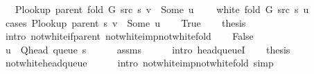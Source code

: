 \begin{isabellebody}
\ \ \ {\isachardoublequoteopen}P{\isacharunderscore}{\kern0pt}lookup\ {\isacharparenleft}{\kern0pt}parent\ {\isacharparenleft}{\kern0pt}fold\ G\ src\ s{\isacharparenright}{\kern0pt}{\isacharparenright}{\kern0pt}\ v\ {\isacharequal}{\kern0pt}\ Some\ u{\isachardoublequoteclose}\isanewline
\ \ \ {\isachardoublequoteopen}{\isasymnot}\ white\ {\isacharparenleft}{\kern0pt}fold\ G\ src\ s{\isacharparenright}{\kern0pt}\ u{\isachardoublequoteclose}\isanewline
%
\isadelimproof
%
\endisadelimproof
%
\isatagproof
{}\isamarkupfalse%
\ {\isacharparenleft}{\kern0pt}cases\ {\isachardoublequoteopen}P{\isacharunderscore}{\kern0pt}lookup\ {\isacharparenleft}{\kern0pt}parent\ s{\isacharparenright}{\kern0pt}\ v\ {\isacharequal}{\kern0pt}\ Some\ u{\isachardoublequoteclose}{\isacharparenright}{\kern0pt}\isanewline
\ \ \isamarkupfalse%
\ True\isanewline
\ \ \isamarkupfalse%
\ {\isacharquery}{\kern0pt}thesis\isanewline
\ \ \ \ \isamarkupfalse%
\ {\isacharparenleft}{\kern0pt}intro\ not{\isacharunderscore}{\kern0pt}white{\isacharunderscore}{\kern0pt}if{\isacharunderscore}{\kern0pt}parent\ not{\isacharunderscore}{\kern0pt}white{\isacharunderscore}{\kern0pt}imp{\isacharunderscore}{\kern0pt}not{\isacharunderscore}{\kern0pt}white{\isacharunderscore}{\kern0pt}fold{\isacharparenright}{\kern0pt}\isanewline
{}\isamarkupfalse%
\isanewline
\ \ \isamarkupfalse%
\ False\isanewline
\ \ \isamarkupfalse%
\ {\isachardoublequoteopen}u\ {\isacharequal}{\kern0pt}\ Q{\isacharunderscore}{\kern0pt}head\ {\isacharparenleft}{\kern0pt}queue\ s{\isacharparenright}{\kern0pt}{\isachardoublequoteclose}\isanewline
\ \ \ \ \isamarkupfalse%
\ assms\isanewline
\ \ \ \ \isamarkupfalse%
\ {\isacharparenleft}{\kern0pt}intro\ head{\isacharunderscore}{\kern0pt}queueI{\isacharparenright}{\kern0pt}\isanewline
\ \ \isamarkupfalse%
\ {\isacharquery}{\kern0pt}thesis\isanewline
\ \ \ \ \isamarkupfalse%
\ not{\isacharunderscore}{\kern0pt}white{\isacharunderscore}{\kern0pt}head{\isacharunderscore}{\kern0pt}queue\isanewline
\ \ \ \ \isamarkupfalse%
\ {\isacharparenleft}{\kern0pt}intro\ not{\isacharunderscore}{\kern0pt}white{\isacharunderscore}{\kern0pt}imp{\isacharunderscore}{\kern0pt}not{\isacharunderscore}{\kern0pt}white{\isacharunderscore}{\kern0pt}fold{\isacharparenright}{\kern0pt}\ simp\isanewline
{}\isamarkupfalse%
%
\endisatagproof
{\isafoldproof}%
%
\isadelimproof
%
\endisadelimproof

\end{isabellebody}
